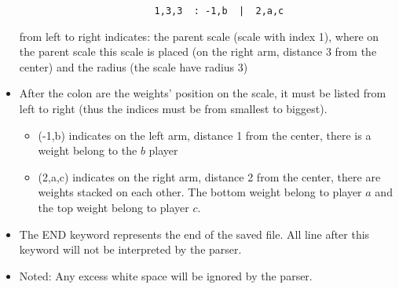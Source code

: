 \documentclass[12pt]{article}
\begin{document}
\begin{itemize}
    \begin{verbatim}
                        1,3,3  : -1,b  |  2,a,c
    \end{verbatim}
    from left to right indicates: the parent scale (scale with index 1), where
    on the parent scale this scale is placed (on the right arm, distance 3 from
    the center) and the radius (the scale have radius 3)
  \item After the colon are the weights' position on the scale, it must be
    listed from left to right (thus the indices must be from smallest to
    biggest). 
    \begin{itemize}
      \item (-1,b) indicates on the left arm, distance 1 from the center, there
        is a weight belong to the $b$ player
      \item (2,a,c) indicates on the right arm, distance 2 from the center,
        there are weights stacked on each other. The bottom weight belong to
        player $a$ and the top weight belong to player $c$.
    \end{itemize}
  \item The END keyword represents the end of the saved file. All line after
    this keyword will not be interpreted by the parser.
  \item Noted: Any excess white space will be ignored by the parser.
\end{itemize}
\end{document}

